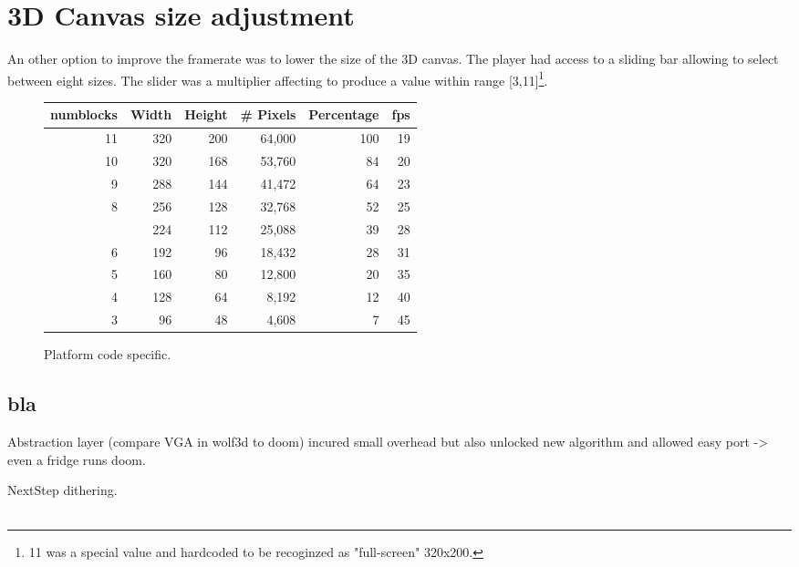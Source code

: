 \section{3D Canvas size adjustment}
An other option to improve the framerate was to lower the size of the 3D canvas. The player had access to a sliding bar allowing to select between eight sizes. The slider was a multiplier affecting  to produce a value within range [3,11]\footnote{11 was a special value and hardcoded to be recoginzed as "full-screen" 320x200.}.\\
\par
{}
\par
\par
{}
\par

\begin{figure}[H]
\centering  
\begin{tabularx}{\textwidth}{ R{1}  R{1} R{1} R{1}  R{1.4}  R{0.6} }
  \toprule
  \textbf{numblocks} & \textbf{Width} & \textbf{Height} & \textbf{\# Pixels} & \textbf{Percentage} & \textbf{fps}\\
  \toprule 

11 & 320 & 200 & 64,000 & 100 & 19 \\
10 & 320 & 168 & 53,760 &  84 & 20 \\
 9 & 288 & 144 & 41,472 &  64 & 23 \\
 8 & 256 & 128 & 32,768 &  52 & 25 \\
 \protect{} & 224 & 112 & 25,088 &  39 & 28 \\
 6 & 192 & 96 & 18,432 &  28 & 31  \\
 5 & 160 & 80 & 12,800 &  20 & 35  \\
 4 & 128 & 64 &  8,192 &  12 & 40  \\
 3 &  96 & 48 &  4,608 &   7 & 45  \\
   \toprule
\end{tabularx}
\caption{Platform code specific.}
\end{figure}

\par





\subsection{bla}
\par

Abstraction layer (compare VGA in wolf3d to doom) incured small overhead but also unlocked new algorithm and allowed easy port -> even a fridge runs doom.\\
\par
NextStep dithering.\\
\\ 






